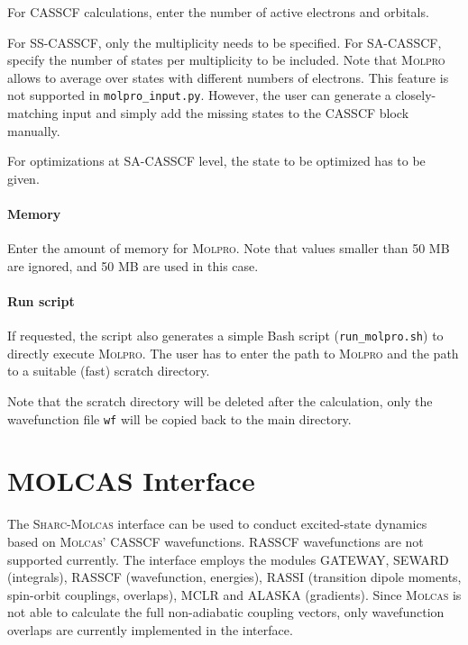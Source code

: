 \documentclass[a4paper,11pt,DIV=15,openany,twoside=false]{scrbook}
\newcommand{\sharc}{\textsc{Sharc}}
\newcommand{\ttt}[1]{\texttt{#1}}
\begin{document}
For CASSCF calculations, enter the number of active electrons and orbitals. 

For SS-CASSCF, only the multiplicity needs to be specified. For SA-CASSCF, specify the number of states per multiplicity to be included. Note that \textsc{Molpro} allows to average over states with different numbers of electrons. This feature is not supported in \ttt{molpro\_input.py}. However, the user can generate a closely-matching input and simply add the missing states to the CASSCF block manually. 

For optimizations at SA-CASSCF level, the state to be optimized has to be given.

\paragraph{Memory}

Enter the amount of memory for \textsc{Molpro}. Note that values smaller than 50 MB are ignored, and 50 MB are used in this case.

\paragraph{Run script}

If requested, the script also generates a simple Bash script (\ttt{run\_molpro.sh}) to directly execute \textsc{Molpro}. The user has to enter the path to \textsc{Molpro} and the path to a suitable (fast) scratch directory. 

Note that the scratch directory will be deleted after the calculation, only the wavefunction file \ttt{wf} will be copied back to the main directory.


\section{MOLCAS Interface}\label{sec:int:molcas}

The \sharc-\textsc{Molcas} interface can be used to conduct excited-state dynamics based on \textsc{Molcas}' CASSCF wavefunctions. RASSCF wavefunctions are not supported currently. The interface employs the modules GATEWAY, SEWARD (integrals), RASSCF (wavefunction, energies), RASSI (transition dipole moments, spin-orbit couplings, overlaps), MCLR and ALASKA (gradients). Since \textsc{Molcas} is not able to calculate the full non-adiabatic coupling vectors, only wavefunction overlaps are currently implemented in the interface.
\end{document}
